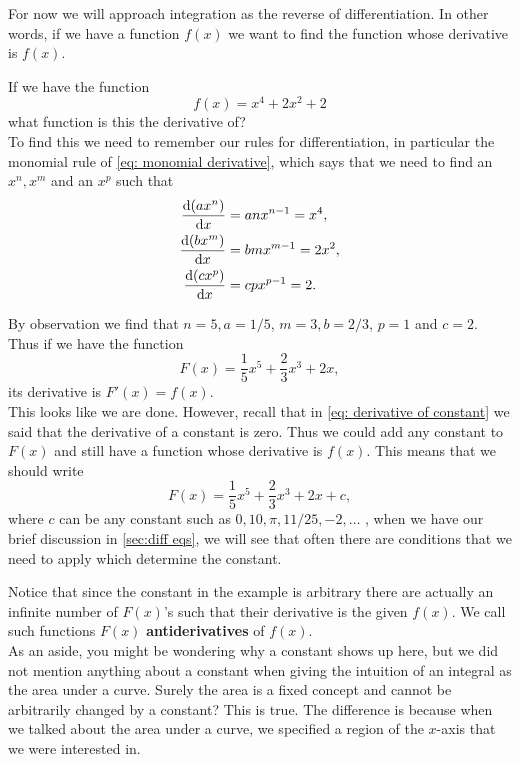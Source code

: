 For now we will approach integration as the reverse of differentiation. In other words, if we have a function $f(x)$ we want to find the function whose derivative is $f(x)$.

\begin{ex}
If we have the function
\begin{equation*}
f(x)=x^{4}+2x^{2}+2
\end{equation*}
what function is this the derivative of?\\

To find this we need to remember our rules for differentiation, in particular the monomial rule of \cref{eq: monomial derivative}, which says that  we need to find an $x^{n}, x^{m}$ and an $x^{p}$ such that
\begin{align*}
\frac{\mathrm{d} (ax^{n})}{\mathrm{d} x}&=anx^{n-1}=x^{4},\\
\frac{\mathrm{d} (bx^{m})}{\mathrm{d} x}&=bmx^{m-1}=2x^{2},\\
\frac{\mathrm{d} (cx^{p})}{\mathrm{d} x}&=cpx^{p-1}=2.
\end{align*}

By observation we find that $n=5, a=1/5$, $m=3, b=2/3$, $p=1$ and $c=2$. Thus if we have the function
\begin{equation*}
F(x)=\frac{1}{5}x^{5}+\frac{2}{3}x^{3}+2x,
\end{equation*}
its derivative is $F'(x)=f(x)$.\\

This looks like we are done. However, recall that in \cref{eq: derivative of constant} we said that the derivative of a constant is zero. Thus we could add any constant to $F(x)$ and still have a function whose derivative is $f(x)$. This means that we should write
\begin{equation*}
F(x)=\frac{1}{5}x^{5}+\frac{2}{3}x^{3}+2x+c,
\end{equation*}
where $c$ can be any constant such as $0, 10, \pi, 11/25, -2, \dots$ , when we have our brief discussion in \cref{sec:diff eqs}, we will see that often there are conditions that we need to apply which determine the constant.  
\end{ex}

Notice that since the constant in the example is arbitrary there are actually an infinite number of $F(x)$'s such that their derivative is the given $f(x)$. We call such functions $F(x)$ \textbf{antiderivatives} of $f(x)$.\\

As an aside, you might be wondering why a constant shows up here, but we did not mention anything about a constant when giving the intuition of an integral as the area under a curve. Surely the area is a fixed concept and cannot be arbitrarily changed by a constant? This is true. The difference is because when we talked about the area under a curve, we specified a region of the $x$-axis that we were interested in.\\

